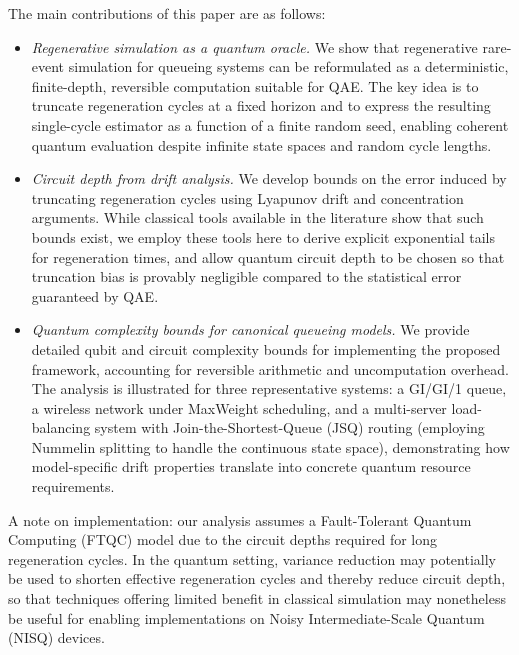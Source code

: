 \documentclass[11pt]{article}
\begin{document}
The main contributions of this paper are as follows:
\begin{itemize}
    \item \textit{Regenerative simulation as a quantum oracle.} We show that regenerative rare-event simulation for queueing systems can be reformulated as a deterministic, finite-depth, reversible computation suitable for QAE. The key idea is to truncate regeneration cycles at a fixed horizon and to express the resulting single-cycle estimator as a function of a finite random seed, enabling coherent quantum evaluation despite infinite state spaces and random cycle lengths.
    \item \textit{Circuit depth from drift analysis.} We develop bounds on the error induced by truncating regeneration cycles using Lyapunov drift and concentration arguments. While classical tools available in the literature \cite{hajek1982hitting,meyn2009markov} show that such bounds exist, we employ these tools here to derive explicit exponential tails for regeneration times, and allow quantum circuit depth to be chosen so that truncation bias is provably negligible compared to the statistical error guaranteed by QAE. 
    \item \textit{Quantum complexity bounds for canonical queueing models.} We provide detailed qubit and circuit complexity bounds for implementing the proposed framework, accounting for reversible arithmetic and uncomputation overhead. The analysis is illustrated for three representative systems: a GI/GI/1 queue, a wireless network under MaxWeight scheduling, and a multi-server load-balancing system with Join-the-Shortest-Queue (JSQ) routing (employing Nummelin splitting to handle the continuous state space), demonstrating how model-specific drift properties translate into concrete quantum resource requirements.
\end{itemize}

A note on implementation: our analysis assumes a Fault-Tolerant Quantum Computing (FTQC) model due to the circuit depths required for long regeneration cycles. In the quantum setting, variance reduction may potentially be used to shorten effective regeneration cycles and thereby reduce circuit depth, so that techniques offering limited benefit in classical simulation may nonetheless be useful for enabling implementations on Noisy Intermediate-Scale Quantum (NISQ) devices. 
\end{document}
